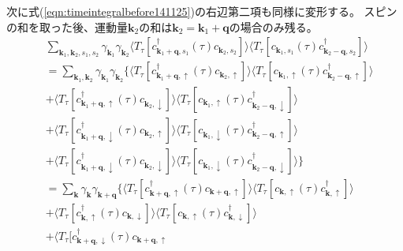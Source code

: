 \documentclass[a4j]{jsarticle}
\begin{document}
次に式(\ref{eqn:timeintegralbefore141125})の右辺第二項も同様に変形する。
スピンの和を取った後、運動量$\bm{k}_{2}$の和は$\bm{k}_{2} = \bm{k}_{1} + \bm{q}$の場合のみ残る。
\begin{align}
	 &
	\sum_{\bm{k}_{1} , \bm{k}_{2} , s_{1} ,s_{2} }
	\gamma_{\bm{k}_{1}}
	\gamma_{\bm{k}_{2}}
	\langle T_{\tau} [
			c_{ \bm{k}_{1}+\bm{q} , s_{1} }^{\dagger} (\tau)
			c_{ \bm{k}_{2} , s_{2} }
		] \rangle
	\langle T_{\tau} [
			c_{ \bm{k}_{1} , s_{1} } (\tau)
			c_{ \bm{k}_{2}-\bm{q} , s_{2} }^{\dagger}
		] \rangle
	\\ &=
	\sum_{\bm{k}_{1} , \bm{k}_{2} }
	\gamma_{\bm{k}_{1}}
	\gamma_{\bm{k}_{2}}
	\Big\{
	\langle T_{\tau} [
			c_{ \bm{k}_{1}+\bm{q} , \uparrow }^{\dagger} (\tau)
			c_{ \bm{k}_{2} , \uparrow }
		] \rangle
	\langle T_{\tau} [
			c_{ \bm{k}_{1} , \uparrow } (\tau)
			c_{ \bm{k}_{2}-\bm{q} , \uparrow }^{\dagger}
		] \rangle
	\nonumber \\[2mm] &
	+
	\langle T_{\tau} [
			c_{ \bm{k}_{1}+\bm{q} , \uparrow }^{\dagger} (\tau)
			c_{ \bm{k}_{2} , \downarrow }
		] \rangle
	\langle T_{\tau} [
			c_{ \bm{k}_{1} , \uparrow } (\tau)
			c_{ \bm{k}_{2}-\bm{q} , \downarrow }^{\dagger}
		] \rangle
	\nonumber \\[2mm] &
	+
	\langle T_{\tau} [
			c_{ \bm{k}_{1}+\bm{q} , \downarrow }^{\dagger} (\tau)
			c_{ \bm{k}_{2} , \uparrow }
		] \rangle
	\langle T_{\tau} [
			c_{ \bm{k}_{1} , \downarrow } (\tau)
			c_{ \bm{k}_{2}-\bm{q} , \uparrow }^{\dagger}
		] \rangle
	\nonumber \\[2mm] &
	+
	\langle T_{\tau} [
			c_{ \bm{k}_{1}+\bm{q} , \downarrow }^{\dagger} (\tau)
			c_{ \bm{k}_{2} , \downarrow }
		] \rangle
	\langle T_{\tau} [
			c_{ \bm{k}_{1} , \downarrow } (\tau)
			c_{ \bm{k}_{2}-\bm{q} , \downarrow }^{\dagger}
		] \rangle
	\Big\}
	\nonumber \\[3mm]
	 & =
	\sum_{ \bm{k} }
	\gamma_{\bm{k}}
	\gamma_{\bm{k}+\bm{q}}
	\Big\{
	\langle T_{\tau} [
			c_{ \bm{k}+\bm{q} , \uparrow }^{\dagger} (\tau)
			c_{ \bm{k}+\bm{q} , \uparrow }
		] \rangle
	\langle T_{\tau} [
			c_{ \bm{k} , \uparrow } (\tau)
			c_{ \bm{k} , \uparrow }^{\dagger}
		] \rangle
	\nonumber \\[2mm] &
	+
	\langle T_{\tau} [
			c_{ \bm{k} , \uparrow }^{\dagger} (\tau)
			c_{ \bm{k} , \downarrow }
		] \rangle
	\langle T_{\tau} [
			c_{ \bm{k} , \uparrow } (\tau)
			c_{ \bm{k} , \downarrow }^{\dagger}
		] \rangle
	\nonumber \\[2mm] &
	+
	\langle T_{\tau} [
			c_{ \bm{k}+\bm{q} , \downarrow }^{\dagger} (\tau)
			c_{ \bm{k}+\bm{q} , \uparrow }

\end{align}
\end{document}
